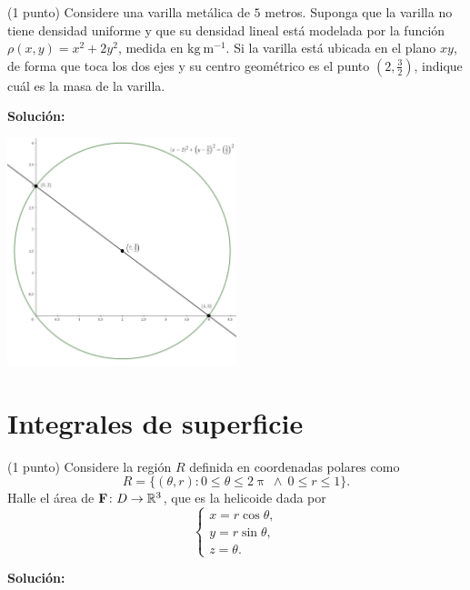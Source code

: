 \documentclass{fmbvecto}
\begin{document}
\begin{problema}
    
    (1 punto) Considere una varilla metálica de \(5\) metros. Suponga que la varilla no tiene densidad uniforme y que su densidad lineal está modelada por la función \(\rho(x, y) = x^2 + 2y^2\), medida en \(\text{kg} \: \text{m}^{-1}\). Si la varilla está ubicada en el plano \(xy\), de forma que toca los dos ejes y su centro geométrico es el punto \(\left(2, \frac{3}{2}\right)\), indique cuál es la masa de la varilla.


\vspace{1em}
\tcblower
\textbf{Solución:}

\begin{center}
    \includegraphics[width=0.5\textwidth]{varilla.png}
    \label{fig:varilla}
\end{center}


\end{problema}


\section{Integrales de superficie}

\begin{problema}
    
    (1 punto) Considere la región \(R\) definida en coordenadas polares como \[R = \{(\theta, r) \colon 0 \leq \theta \leq 2\uppi \ \land \ 0 \leq r \leq 1\}.\] Halle el área de \(\boldsymbol{{\mathbf{F}}}\colon D\to \mathbb{R}^3\), que es la helicoide dada por \[\begin{cases}
        x = r\cos\theta, \\
        y = r\sin\theta, \\
        z = \theta.
    \end{cases}\]


\vspace{1em}
\tcblower
\textbf{Solución:}



\end{problema}
\end{document}
